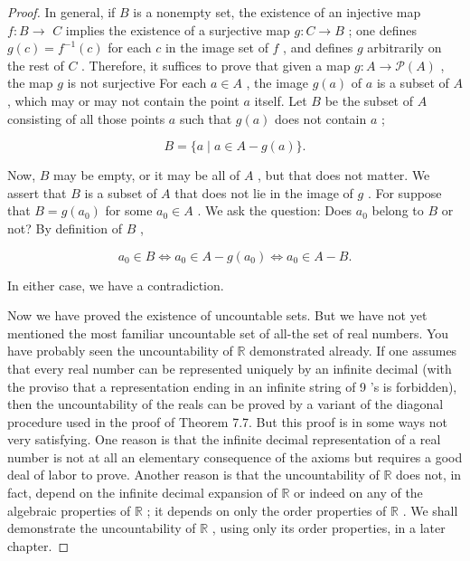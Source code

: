 \begin{proof}In general, if \(B\) is a nonempty set, the existence of an injective map \(f : B \rightarrow\)  \(C\) implies the existence of a surjective map \(g : C \rightarrow  B\) ; one defines \(g\left( c\right)  = {f}^{-1}\left( c\right)\) for each \(c\) in the image set of \(f\) , and defines \(g\) arbitrarily on the rest of \(C\) .
Therefore, it suffices to prove that given a map \(g : A \rightarrow  \mathcal{P}\left( A\right)\) , the map \(g\) is not surjective For each \(a \in  A\) , the image \(g\left( a\right)\) of \(a\) is a subset of \(A\) , which may or may not contain the point \(a\) itself. Let \(B\) be the subset of \(A\) consisting of all those points \(a\) such that \(g\left( a\right)\) does not contain \(a\) ;

\[
B = \{ a \mid  a \in  A - g\left( a\right) \} .
\]

Now, \(B\) may be empty, or it may be all of \(A\) , but that does not matter. We assert that \(B\) is a subset of \(A\) that does not lie in the image of \(g\) . For suppose that \(B = g\left( {a}_{0}\right)\) for some \({a}_{0} \in  A\) . We ask the question: Does \({a}_{0}\) belong to \(B\) or not? By definition of \(B\) ,

\[
{a}_{0} \in  B \Leftrightarrow  {a}_{0} \in  A - g\left( {a}_{0}\right)  \Leftrightarrow  {a}_{0} \in  A - B.
\]

In either case, we have a contradiction.

Now we have proved the existence of uncountable sets. But we have not yet mentioned the most familiar uncountable set of all-the set of real numbers. You have probably seen the uncountability of \(\mathbb{R}\) demonstrated already. If one assumes that every real number can be represented uniquely by an infinite decimal (with the proviso that a representation ending in an infinite string of 9 's is forbidden), then the uncountability of the reals can be proved by a variant of the diagonal procedure used in the proof of Theorem 7.7. But this proof is in some ways not very satisfying. One reason is that the infinite decimal representation of a real number is not at all an elementary consequence of the axioms but requires a good deal of labor to prove. Another reason is that the uncountability of \(\mathbb{R}\) does not, in fact, depend on the infinite decimal expansion of \(\mathbb{R}\) or indeed on any of the algebraic properties of \(\mathbb{R}\) ; it depends on only the order properties of \(\mathbb{R}\) . We shall demonstrate the uncountability of \(\mathbb{R}\) , using only its order properties, in a later chapter.
\end{proof}
